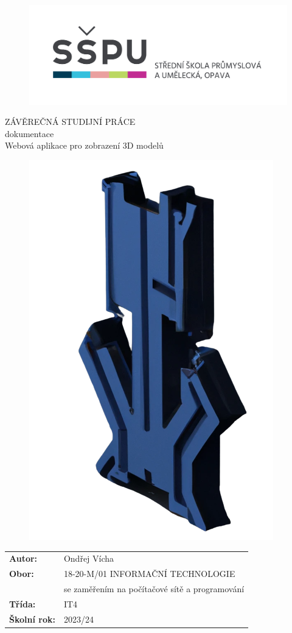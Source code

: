 \documentclass[12pt, a4paper,
oneside,      %
openright
]{report}
\title{\nazevPrace} %
\author{\jmenoAutora} %
\date{\datumOdevzdani} %
\newcommand\obor{INFORMAČNÍ TECHNOLOGIE} %
\newcommand\kodOboru{18-20-M/01} %
\newcommand\zamereni{se zaměřením na počítačové sítě a programování} %
\newcommand\trida{IT4} %
\newcommand\jmenoAutora{Ondřej Vícha}  %
\newcommand\skolniRok{2023/24} %
\newcommand\nazevPrace{Webová aplikace pro zobrazení 3D modelů} %
\begin{document}
	
	\pagestyle{empty}
	
	\cleardoublepage

	
	{\selectfont
		\begin{figure}[h]
			\centering
			\includegraphics[width=0.6\linewidth]{image/logo-skoly.png} 
		\end{figure}
		
		
		{\bfseries %
			\begin{center}
				\vspace{0.025 \textheight}
				\LARGE{ZÁVĚREČNÁ STUDIJNÍ PRÁCE}\\
				\large{dokumentace}\\
				\vspace{0.075 \textheight}
				\LARGE {\nazevPrace}\\
			\end{center}  
		}%
		
		\begin{figure}[h]
			\centering
			\includegraphics[width=0.2\linewidth]{image/logo-background.png} 
		\end{figure}
		
		\vspace{0.02 \textheight}
		\begin{table}[h!]
			\begin{tabular}{ll}
				\textbf{Autor:} & \jmenoAutora\\ 
				\textbf{Obor:} & \kodOboru { } \obor\\
				\textbf{} & \zamereni\\
				\textbf{Třída:} & \trida\\
				\textbf{Školní rok:} & \skolniRok\\
			\end{tabular}
			
		\end{table}		
	}
	
\end{document}

